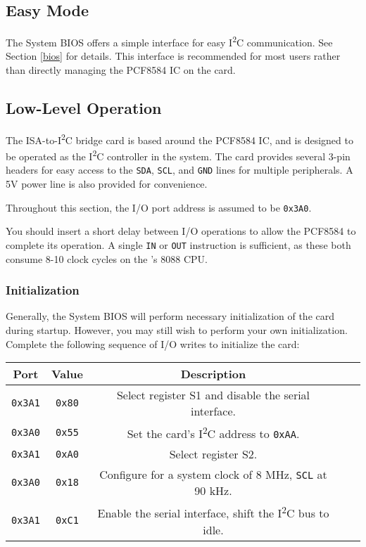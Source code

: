 \documentclass[twoside,10pt,letterpaper]{refart}
\newcommand{\itwoc}{I\textsuperscript{2}C}
\begin{document}
\subsection{Easy Mode}
The  System BIOS offers a simple interface for easy \itwoc{} communication. See Section \ref{bios} for details.
This interface is recommended for most users rather than directly managing the PCF8584 IC on the card.

\subsection{Low-Level Operation}
The ISA-to-\itwoc{} bridge card is based around the PCF8584 IC, and is designed to be operated as the \itwoc
controller in the system. The card provides several 3-pin headers for easy access to the \texttt{SDA}, \texttt{SCL},
and \texttt{GND} lines for multiple peripherals. A 5V power line is also provided for convenience.

Throughout this section, the I/O port address is assumed to be \texttt{0x3A0}.

You should insert a short delay between I/O operations to allow the PCF8584 to complete its operation. A single
\texttt{IN} or \texttt{OUT} instruction is sufficient, as these both consume 8-10 clock cycles on the 's 8088
CPU.

\subsubsection{Initialization}
Generally, the  System BIOS will perform necessary initialization of the card during startup.
However, you may still wish to perform your own initialization. Complete the following sequence of I/O writes
to initialize the card:

\begin{center}
    \begin{tabular}{ c|c|c|c|c }
        \textbf{Port} & \textbf{Value} & \textbf{Description} \\
        \hline
        \texttt{0x3A1} & \texttt{0x80} & Select register S1 and disable the serial interface. \\
        \texttt{0x3A0} & \texttt{0x55} & Set the card's \itwoc{} address to \texttt{0xAA}. \\
        \texttt{0x3A1} & \texttt{0xA0} & Select register S2. \\
        \texttt{0x3A0} & \texttt{0x18} & Configure for a system clock of 8 MHz\footnotemark, \texttt{SCL} at 90 kHz. \\
        \texttt{0x3A1} & \texttt{0xC1} & Enable the serial interface, shift the \itwoc{} bus to idle. \\
    \end{tabular}
\end{center}
\end{document}
